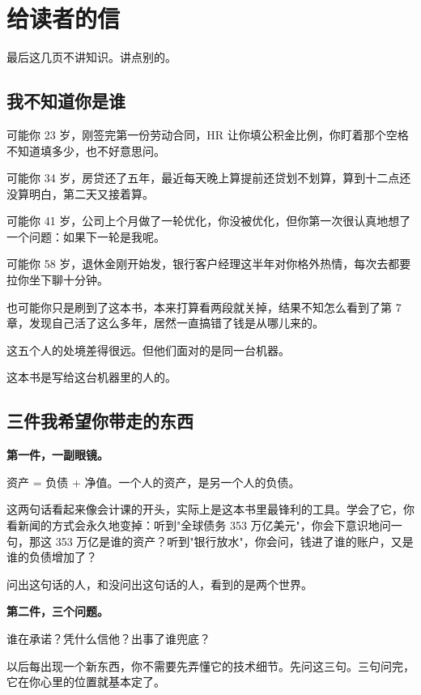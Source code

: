 \chapter{给读者的信}

\begin{ledetext}
最后这几页不讲知识。讲点别的。
\end{ledetext}

\section{我不知道你是谁}

可能你 23 岁，刚签完第一份劳动合同，HR 让你填公积金比例，你盯着那个空格不知道填多少，也不好意思问。

可能你 34 岁，房贷还了五年，最近每天晚上算提前还贷划不划算，算到十二点还没算明白，第二天又接着算。

可能你 41 岁，公司上个月做了一轮优化，你没被优化，但你第一次很认真地想了一个问题：如果下一轮是我呢。

可能你 58 岁，退休金刚开始发，银行客户经理这半年对你格外热情，每次去都要拉你坐下聊十分钟。

也可能你只是刷到了这本书，本来打算看两段就关掉，结果不知怎么看到了第 7 章，发现自己活了这么多年，居然一直搞错了钱是从哪儿来的。

这五个人的处境差得很远。但他们面对的是同一台机器。

这本书是写给这台机器里的人的。

\section{三件我希望你带走的东西}

\textbf{第一件，一副眼镜。}

资产 = 负债 + 净值。一个人的资产，是另一个人的负债。

这两句话看起来像会计课的开头，实际上是这本书里最锋利的工具。学会了它，你看新闻的方式会永久地变掉：听到"全球债务 353 万亿美元"，你会下意识地问一句，那这 353 万亿是谁的资产？听到"银行放水"，你会问，钱进了谁的账户，又是谁的负债增加了？

问出这句话的人，和没问出这句话的人，看到的是两个世界。

\textbf{第二件，三个问题。}

\begin{pullquote}{}
谁在承诺？凭什么信他？出事了谁兜底？
\end{pullquote}

以后每出现一个新东西，你不需要先弄懂它的技术细节。先问这三句。三句问完，它在你心里的位置就基本定了。

